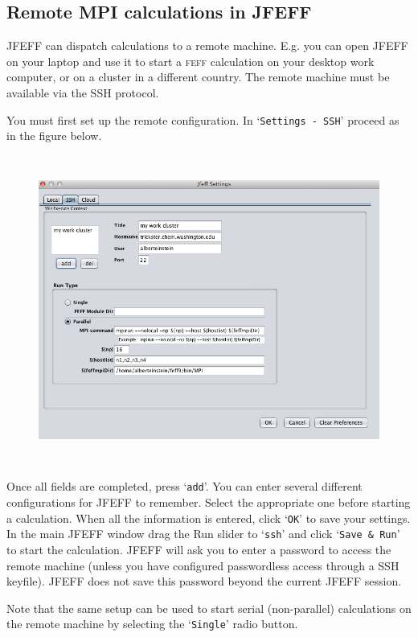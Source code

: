 \documentclass[11pt,oneside]{report} %
\newcommand{\program}[1]{\textsc{#1}}
\newcommand{\feff}{\program{feff}}
\newcommand{\file}[1]{`\texttt{#1}'}
\begin{document}
\subsection{Remote MPI calculations in JFEFF}

JFEFF can dispatch calculations to a remote machine.  E.g. you can open JFEFF on your laptop and use it to start a {\feff} calculation on your desktop work computer, or on a cluster in a different country.  The remote machine must be available via the SSH protocol.

You must first set up the remote configuration.  In \file{Settings - SSH} proceed as in the figure below.

\begin{figure}[H]
	\centering
		\includegraphics[height=4.0in]{settingsMPIssh.png}
	\label{fig:settingsMPIssh}
\end{figure}

Once all fields are completed, press \file{add}.  You can enter several different configurations for JFEFF to remember.  Select the appropriate one before starting a calculation.  When all the information is entered, click \file{OK} to save your settings.  In the main JFEFF window drag the Run slider to \file{ssh} and click \file{Save \& Run} to start the calculation.  JFEFF will ask you to enter a password to access the remote machine (unless you have configured passwordless access through a SSH keyfile).  JFEFF does not save this password beyond the current JFEFF session.

Note that the same setup can be used to start serial (non-parallel) calculations on the remote machine by selecting the \file{Single} radio button.
\end{document}
